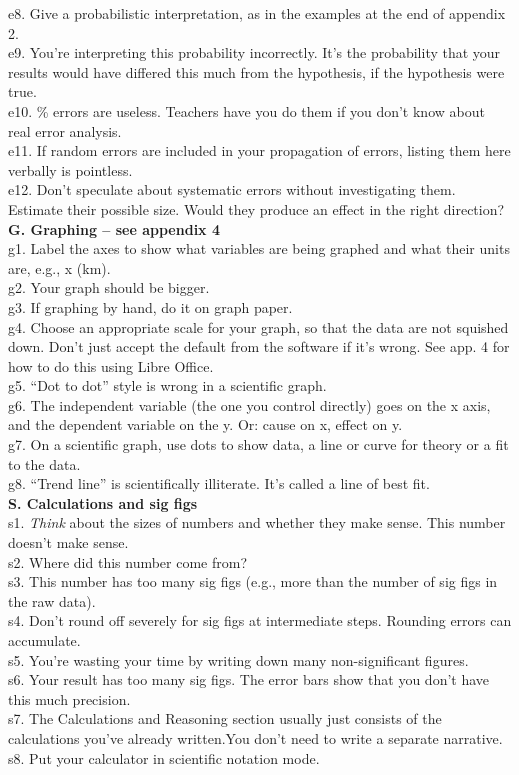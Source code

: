 \begin{multicols}{2}[]
e8. Give a probabilistic interpretation, as in the examples at the end of appendix 2.\\
e9. You're interpreting this probability incorrectly. It's the probability that your results would have differed this much from the hypothesis, if the hypothesis were true.\\
e10. \% errors are useless. Teachers have you do them if you don't know about real error analysis.\\
e11. If random errors are included in your propagation of errors, listing them here verbally is pointless.\\
e12. Don't speculate about systematic errors without investigating them. Estimate their possible size. Would they produce an effect in the right direction?\\
\textbf{G. Graphing -- see appendix 4}\\
g1. Label the axes to show what variables are being graphed and what their units are, e.g., x (km).\\
g2. Your graph should be bigger.\\
g3. If graphing by hand, do it on graph paper.\\
g4. Choose an appropriate scale for your graph, so that the data are not squished down. Don't just accept the default from the software if it's wrong. See app. 4 for how to do this using Libre Office.\\
g5. ``Dot to dot'' style is wrong in a scientific graph.\\
g6. The independent variable (the one you control directly) goes on the x axis, and  the dependent variable on the y. Or: cause on x, effect on y.\\
g7. On a scientific graph, use dots to show data, a line or curve for theory or a fit to the data.\\
g8. ``Trend line'' is scientifically illiterate. It's called a line of best fit.\\
\textbf{S. Calculations and sig figs}\\
s1. \emph{Think} about the sizes of numbers and whether they make sense. This number doesn't make sense.\\
s2. Where did this number come from?\\
s3. This number has too many sig figs (e.g., more than the number of sig figs in the raw data).\\
s4. Don't round off severely for sig figs at intermediate steps. Rounding errors can accumulate.\\
s5. You're wasting your time by writing down many non-significant figures.\\
s6. Your result has too many sig figs. The error bars show that you don't have this much precision.\\
s7. The Calculations and Reasoning section usually just consists of the calculations you've already written.You don't need to write a separate narrative.\\
s8. Put your calculator in scientific notation mode.\\
\end{multicols}
